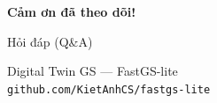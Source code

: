 \begin{frame}[c]{}
\centering
{\Huge \textbf{Cảm ơn đã theo dõi!}}

\vspace{6mm}
{\LARGE Hỏi đáp (Q\&A)}

\vspace{10mm}
{\small Digital Twin GS --- FastGS-lite \\ \texttt{github.com/KietAnhCS/fastgs-lite}}
\end{frame}
